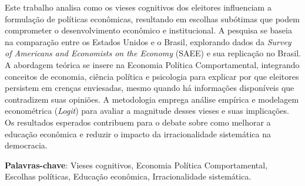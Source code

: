 
\setlength{\absparsep}{18pt} %
\begin{resumo}
    Este trabalho analisa como os vieses cognitivos dos eleitores influenciam a formulação de políticas econômicas, resultando em escolhas subótimas que podem comprometer o desenvolvimento econômico e institucional. A pesquisa se baseia na comparação entre os Estados Unidos e o Brasil, explorando dados da \textit{Survey of Americans and Economists on the Economy} (SAEE) e sua replicação no Brasil. A abordagem teórica se insere na Economia Política Comportamental, integrando conceitos de economia, ciência política e psicologia para explicar por que eleitores persistem em crenças enviesadas, mesmo quando há informações disponíveis que contradizem suas opiniões. A metodologia emprega análise empírica e modelagem econométrica (\textit{Logit}) para avaliar a magnitude desses vieses e suas implicações. Os resultados esperados contribuem para o debate sobre como melhorar a educação econômica e reduzir o impacto da irracionalidade sistemática na democracia.

 \textbf{Palavras-chave}: Vieses cognitivos, Economia Política Comportamental, Escolhas políticas, Educação econômica, Irracionalidade sistemática.
\end{resumo}
